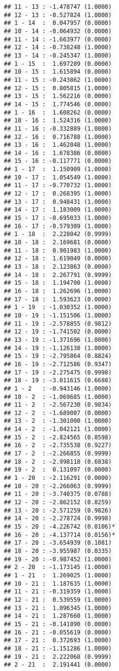 \documentclass[12pt,]{article}
\begin{document}
\begin{verbatim}
## 11 - 13 : -1.478747 (1.0000)
## 12 - 13 : -0.527824 (1.0000)
## 1 - 14  :  0.047957 (0.0000)
## 10 - 14 : -0.064932 (0.0000)
## 11 - 14 : -1.663977 (0.0000)
## 12 - 14 : -0.738248 (1.0000)
## 13 - 14 : -0.245347 (1.0000)
## 1 - 15  :  1.697289 (0.0000)
## 10 - 15 :  1.615894 (0.0000)
## 11 - 15 : -0.243862 (1.0000)
## 12 - 15 :  0.805815 (1.0000)
## 13 - 15 :  1.562216 (0.0000)
## 14 - 15 :  1.774546 (0.0000)
## 1 - 16  :  1.608262 (0.0000)
## 10 - 16 :  1.524316 (1.0000)
## 11 - 16 : -0.332889 (1.0000)
## 12 - 16 :  0.716788 (1.0000)
## 13 - 16 :  1.462048 (1.0000)
## 14 - 16 :  1.678386 (0.0000)
## 15 - 16 : -0.117771 (0.0000)
## 1 - 17  :  1.150909 (1.0000)
## 10 - 17 :  1.054549 (1.0000)
## 11 - 17 : -0.770732 (1.0000)
## 12 - 17 :  0.268395 (1.0000)
## 13 - 17 :  0.948431 (1.0000)
## 14 - 17 :  1.183009 (1.0000)
## 15 - 17 : -0.695033 (1.0000)
## 16 - 17 : -0.579309 (1.0000)
## 1 - 18  :  2.228042 (0.9999)
## 10 - 18 :  2.169681 (0.0000)
## 11 - 18 :  0.901983 (1.0000)
## 12 - 18 :  1.619049 (0.0000)
## 13 - 18 :  2.123863 (0.0000)
## 14 - 18 :  2.267791 (0.9999)
## 15 - 18 :  1.194700 (1.0000)
## 16 - 18 :  1.262696 (1.0000)
## 17 - 18 :  1.593623 (0.0000)
## 1 - 19  : -1.030352 (1.0000)
## 10 - 19 : -1.151506 (1.0000)
## 11 - 19 : -2.578855 (0.9812)
## 12 - 19 : -1.741502 (0.0000)
## 13 - 19 : -1.371696 (1.0000)
## 14 - 19 : -1.126138 (1.0000)
## 15 - 19 : -2.795864 (0.8824)
## 16 - 19 : -2.712586 (0.9347)
## 17 - 19 : -2.275475 (0.9998)
## 18 - 19 : -3.011615 (0.6688)
## 1 - 2   : -0.943146 (1.0000)
## 10 - 2  : -1.069685 (1.0000)
## 11 - 2  : -2.567230 (0.9834)
## 12 - 2  : -1.689007 (0.0000)
## 13 - 2  : -1.301000 (1.0000)
## 14 - 2  : -1.042121 (1.0000)
## 15 - 2  : -2.824565 (0.8598)
## 16 - 2  : -2.735538 (0.9227)
## 17 - 2  : -2.266855 (0.9999)
## 18 - 2  : -2.998118 (0.6838)
## 19 - 2  :  0.131097 (0.0000)
## 1 - 20  : -2.116291 (0.0000)
## 10 - 20 : -2.266063 (0.9999)
## 11 - 20 : -3.740375 (0.0788)
## 12 - 20 : -2.862152 (0.8259)
## 13 - 20 : -2.571259 (0.9826)
## 14 - 20 : -2.278724 (0.9998)
## 15 - 20 : -4.226742 (0.0106)*
## 16 - 20 : -4.137714 (0.0156)*
## 17 - 20 : -3.654939 (0.1081)
## 18 - 20 : -3.955987 (0.0335)
## 19 - 20 : -0.987452 (1.0000)
## 2 - 20  : -1.173145 (1.0000)
## 1 - 21  :  1.269025 (1.0000)
## 10 - 21 :  1.187635 (1.0000)
## 11 - 21 : -0.319359 (1.0000)
## 12 - 21 :  0.539559 (1.0000)
## 13 - 21 :  1.096345 (1.0000)
## 14 - 21 :  1.287660 (1.0000)
## 15 - 21 : -0.141890 (0.0000)
## 16 - 21 : -0.055619 (0.0000)
## 17 - 21 :  0.372693 (1.0000)
## 18 - 21 : -1.151286 (1.0000)
## 19 - 21 :  2.222068 (0.9999)
## 2 - 21  :  2.191441 (0.0000)

\end{verbatim}
\end{document}

